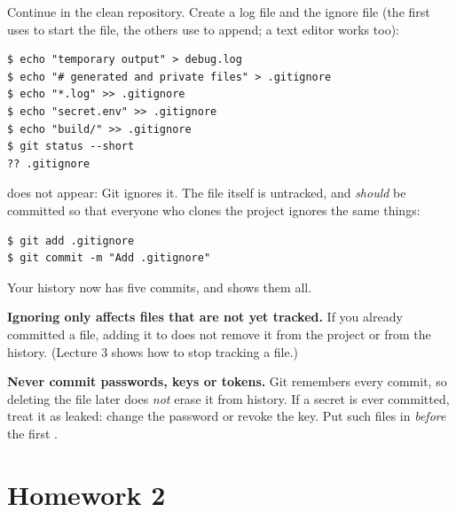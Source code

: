 Continue in the clean  repository. Create a log file and the ignore file (the first  uses \code{>} to start the file, the others use \code{>>} to append; a text editor works too):

\begin{lstlisting}
$ echo "temporary output" > debug.log
$ echo "# generated and private files" > .gitignore
$ echo "*.log" >> .gitignore
$ echo "secret.env" >> .gitignore
$ echo "build/" >> .gitignore
$ git status --short
?? .gitignore
\end{lstlisting}

 does not appear: Git ignores it. The  file itself is untracked, and \emph{should} be committed so that everyone who clones the project ignores the same things:

\begin{lstlisting}
$ git add .gitignore
$ git commit -m "Add .gitignore"
\end{lstlisting}

Your history now has five commits, and  shows them all.

\begin{pitfall}
\textbf{Ignoring only affects files that are not yet tracked.} If you already committed a file, adding it to  does not remove it from the project or from the history. (Lecture 3 shows how to stop tracking a file.)
\end{pitfall}

\begin{pitfall}
\textbf{Never commit passwords, keys or tokens.} Git remembers every commit, so deleting the file later does \emph{not} erase it from history. If a secret is ever committed, treat it as leaked: change the password or revoke the key. Put such files in  \emph{before} the first .
\end{pitfall}

\section{Homework 2}

